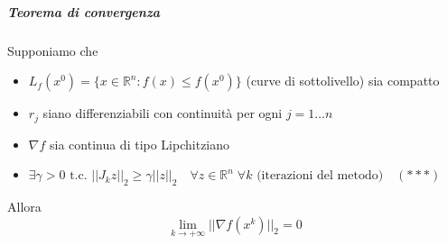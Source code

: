 \documentclass[a4paper,10pt]{article}
\begin{document}
\subparagraph{Teorema di convergenza}
Supponiamo che 
\begin{itemize}
\item $L_f(x^{0}) = \{ x \in \mathbb{R}^{n} : f(x) \leq f(x^{0}) \}$
     (curve di sottolivello) sia compatto
\item $r_j$ siano differenziabili con continuit\`a  per ogni $j=1\ldots n$
 \item $\nabla f$ sia continua di tipo Lipchitziano
\item $\exists \gamma > 0  \text{ t.c. } || J_kz||_{2} \geq \gamma ||z||_{2} 
\quad \forall z \in \mathbb{R}^{n} \; \forall k \text{ (iterazioni del metodo)} \quad (***)$ 
\end{itemize}
Allora 
$$ \lim_{k \to +\infty} || \nabla f(x^{k})||_{2} = 0 $$
\end{document}
